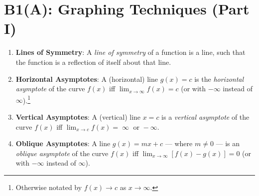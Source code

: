 \documentclass[oneside]{book}
\theoremstyle{definition}
\theoremstyle{plain}
\theoremstyle{remark}
\theoremstyle{plain}
\begin{document}
\chapter{B1(A): Graphing Techniques (Part I)}
\begin{tcolorbox}
    [
    colback=yellow!20,
    boxrule=1pt,
    boxsep=1pt,
    left=2pt,right=2pt,top=2pt,bottom=2pt,
    oversize=2pt,
    colframe=blue!75!black,
    before skip=\topsep,
    after skip=\topsep,
    title=General Definitions,
]
    \begin{enumerate}
        \item \textbf{Lines of Symmetry}: A \emph{line of symmetry} of a function is a line, such that the function is a reflection of itself about that line.
        \item \textbf{Horizontal Asymptotes}: A (horizontal) line \(g(x)=c\) is the \emph{horizontal asymptote} of the curve \(f(x)\) iff \(\lim_{x \to \infty}{f(x)}=c\) (or with \(-\infty\) instead of \(\infty\)).\footnote{Otherwise notated by \(f(x) \to c\) as \(x \to \infty\).}
        \item \textbf{Vertical Asymptotes}: A (vertical) line \(x=c\) is a \emph{vertical asymptote} of the curve \(f(x)\) iff \(\lim_{x \to c}{f(x)}=\operatorname{\infty} \text{ or } -\infty\).
        \item \textbf{Oblique Asymptotes}: A line \(g(x)=mx+c\) --- where \(m \neq 0\) --- is an \emph{oblique asymptote} of the curve \(f(x)\) iff \(\lim_{x \to \infty}[f(x)-g(x)]=0\) (or with \(-\infty\) instead of \(\infty\)).
    \end{enumerate}
\end{tcolorbox}
\end{document}
